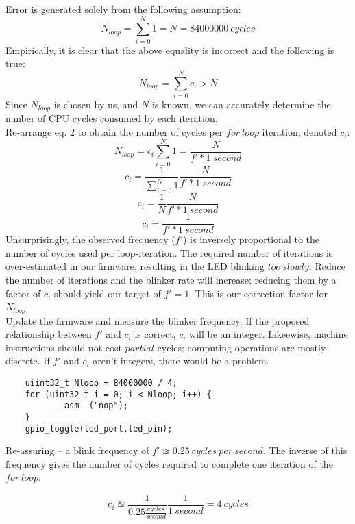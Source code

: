 \documentclass[a4paper,12pt]{article}   	%
\begin{document}
\begin{flushleft}

Error is generated solely from the following assumption:
$$N_{loop} = \sum_{i=0}^{N}1 = N = 84000000\ cycles$$
Empirically, it is clear that the above equality is incorrect and the following is true:
$$N_{loop} = \sum_{i=0}^{N}c_i > N$$
Since $N_{loop}$ is chosen by us, and $N$ is known, we can accurately 
determine the nunber of CPU cycles consumed by each iteration.\\[2 ex]

Re-arrange eq. 2 to obtain the number of cycles per $for\ loop$ iteration, denoted $c_i$:
$$N_{loop} = c_i\sum_{i=0}^{N} 1 = \frac{N}{f' * 1\ second}$$
$$c_i = \frac{1}{\sum_{i=0}^{N} 1} \frac{N}{f' * 1\ second}$$
$$c_i = \frac{1}{N} \frac{N}{f'*1\ second}$$
$$c_i = \frac{1}{f' * 1\ second}$$
Unsurprisingly, the observed frequency ($f'$) is inversely proportional to the number of cycles used per loop-iteration. 
The required number of iterations is over-estimated in our firmware, resulting in the LED blinking $too\ slowly$. 
Reduce the number of iterations and the blinker rate will increase; reducing them by a factor of $c_i$ should yield our target of $f' = 1$.
This is our correction factor for $N_{loop}$.\\[2 ex]

Update the firmware and measure the blinker frequency. If the proposed relationship between $f'$ and $c_i$ is correct, 
$c_i$ will be an integer. Likeewise, machine instructions should not cost $partial$ cycles; computing operations are mostly discrete.
If $f'$ and $c_i$ aren't integers, there would be a problem.\\[2 ex]

\begin{lstlisting}
    uiint32_t Nloop = 84000000 / 4;
    for (uint32_t i = 0; i < Nloop; i++) {
          __asm__("nop");
    }
    gpio_toggle(led_port,led_pin);
    \end{lstlisting}

Re-assuring -- a blink frequency of $f' \approxeq 0.25\ cycles\ per\ second$. The inverse of this frequency gives the 
number of cycles required to complete one iteration of the $for\ loop$:

$$c_i \approxeq \frac{1}{0.25 \frac{cycles}{second}} \frac{1}{1\ second} = 4\ cycles$$


\end{flushleft}
\end{document}
